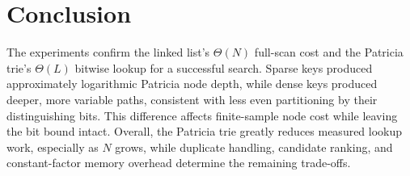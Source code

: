 \documentclass[10pt]{article}
\begin{document}
\section{Conclusion}

The experiments confirm the linked list's $\Theta(N)$ full-scan cost and the Patricia
trie's $\Theta(L)$ bitwise lookup for a successful search. Sparse keys produced
approximately logarithmic Patricia node depth, while dense keys produced deeper, more
variable paths, consistent with less even partitioning by their distinguishing bits. This
difference affects finite-sample node cost while leaving the bit bound intact. Overall,
the Patricia trie greatly reduces measured lookup work, especially as $N$ grows, while
duplicate handling, candidate ranking, and constant-factor memory overhead determine the
remaining trade-offs.
\end{document}
